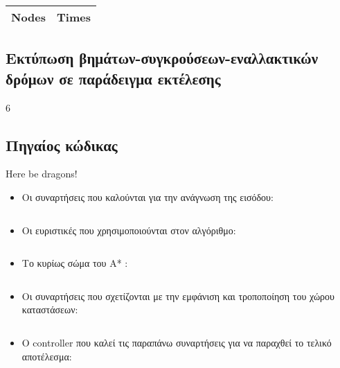 \documentclass[a4paper,9pt]{article}
\begin{document}
\begin{minipage}{0.4\textwidth}
	\begin{tabular}{ | l | l |}
		\hline
		Nodes & Times \\
		\hline
		\hline
	\end{tabular}
	\end{minipage}

\subsection{Εκτύπωση βημάτων-συγκρούσεων-εναλλακτικών δρόμων σε παράδειγμα
εκτέλεσης}
6

\subsection{Πηγαίος κώδικας}
Here be dragons!
\begin{itemize}
\item
Οι συναρτήσεις που καλούνται για την ανάγνωση της εισόδου:
\inputminted[linenos,fontsize=\footnotesize,frame=leftline]{python}{files/inparser.py}

\item
Οι ευριστικές που χρησιμοποιούνται στον αλγόριθμο:
\inputminted[linenos,fontsize=\footnotesize,frame=leftline]{python}{files/heuristics.py}

\item
Το κυρίως σώμα του A* :
\inputminted[linenos,fontsize=\footnotesize,frame=leftline]{python}{files/astar.py}

\item
Οι συναρτήσεις που σχετίζονται με την εμφάνιση και τροποποίηση του χώρου
καταστάσεων:
\inputminted[linenos,fontsize=\footnotesize,frame=leftline]{python}{files/grids.py}

\item
Ο controller που καλεί τις παραπάνω συναρτήσεις για να παραχθεί το τελικό
αποτέλεσμα:
\inputminted[linenos,fontsize=\footnotesize,frame=leftline]{python}{files/controller.py}
\end{itemize}
\end{document}
